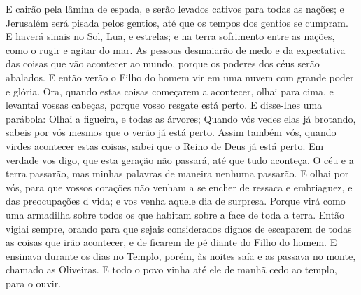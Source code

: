 {  E cairão pela lâmina de espada, e serão levados cativos para todas as nações; e Jerusalém será pisada pelos gentios, até que os tempos dos gentios se cumpram.
  E haverá sinais no Sol,
{} Lua, e
{} estrelas; e na terra sofrimento entre as nações, como o rugir e agitar do mar.
  As pessoas desmaiarão de medo e da expectativa das coisas que vão acontecer ao mundo, porque os poderes dos céus serão abalados.
  E então verão o Filho do homem vir em uma nuvem com grande poder e glória.
  Ora, quando estas coisas começarem a acontecer, olhai para cima, e levantai vossas cabeças, porque vosso resgate está perto.
  E disse-lhes uma parábola: Olhai a figueira, e todas as árvores;
  Quando vós vedes elas já brotando, sabeis por vós mesmos que o verão já está perto.
  Assim também vós, quando virdes acontecer estas coisas, sabei que o Reino de Deus já está perto.
  Em verdade vos digo, que esta geração não passará, até que tudo aconteça.
  O céu e a terra passarão, mas minhas palavras de maneira nenhuma passarão.
  E olhai por vós, para que vossos corações não venham a se encher de ressaca e embriaguez, e das preocupações d
{} vida; e vos venha aquele dia de surpresa.
  Porque virá como uma armadilha sobre todos os que habitam sobre a face de toda a terra.
  Então vigiai sempre, orando para que sejais considerados dignos de escaparem de todas as coisas que irão acontecer, e de ficarem de pé diante do Filho do homem.
  E ensinava durante os dias no Templo, porém, às noites saía e as passava no monte, chamado as Oliveiras.
  E todo o povo vinha até ele de manhã cedo ao templo, para o ouvir.
\par }

